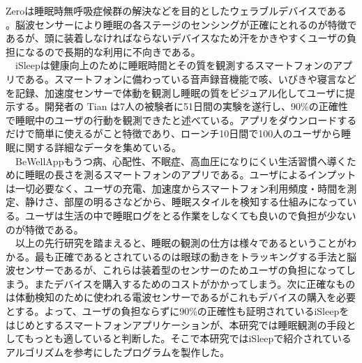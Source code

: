 Zeroは睡眠時無呼吸症候群の解決などを目的としたウェラブルデバイスである \cite{beWellApp}。脳波センサーにより睡眠の各ステージのセンシングが正確にとれるのが特徴であるが、頭に装着しなければならないデバイスなため汗をかきやすくユーザの負担になるので長期的な利用に不向きである。\\
　iSleepは健康向上のために睡眠時間とその質を観測するスマートフォンのアプリである\cite{iSleep}。スマートフォンに備わっている音声録音機能で咳、いびきや寝言などを記録、加速度センサーで体動を観測し睡眠の質をビジュアル化してユーザに提示する。開発者の Tian は7人の被験者に51日間の実験を遂行し、90\%の正確性で睡眠中のユーザの行動を観測できたと述べている\cite{iSleep}。アプリをダウンロードするだけで簡単に使えるがこと特徴であり、ローンチ10日間で100人のユーザから睡眠に関する詳細なデータを集めている。\\
　BeWellAppもうつ病、心配性、不眠症、高血圧になりにくい生活習慣へ導くために睡眠の長さを測るスマートフォンのアプリである。ユーザによるインプットは一切必要なく、ユーザの充電、加速度からスマートフォン利用頻度・時間を測定、静けさ、部屋の明るさなどから、睡眠スタイルを検知する仕組みになっている\cite{beWellApp}。ユーザは生活の中で睡眠ログをとる作業をしなくても良いので負担が少ないのが特徴である。\\
　以上の先行研究を踏まえると、睡眠の観測の仕方は様々であるということがわかる。最も正確であるとされているのは眼球の動きをトラッキングする手法と脳波センサーであるが、これらは装着型のセンサーのためユーザの負担になってしまう。またデバイスを購入するためのコストがかかってしまう。次に正確なものは体動検知のために使われる電波センサーであるがこれもデバイスの購入を必要とする。よって、ユーザの負担ならずに90\%の正確性も証明されているiSleepをはじめとするスマートフォンアプリケーションが、本研究では睡眠観測の手段としてもっとも適していると判断した。そこで本研究ではiSleepで紹介されているアルゴリズムを参考にしたプログラムを製作した。

